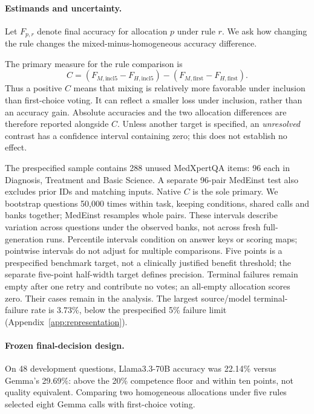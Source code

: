 \documentclass{article}
\begin{document}
\paragraph{Estimands and uncertainty.}
Let $F_{p,r}$ denote final accuracy for allocation $p$ under rule $r$. We ask how changing the rule changes the mixed-minus-homogeneous accuracy difference.

The primary measure for the rule comparison is
\begin{equation}
C=(F_{M,\mathrm{incl5}}-F_{H,\mathrm{incl5}})-(F_{M,\mathrm{first}}-F_{H,\mathrm{first}}).
\label{eq:C}
\end{equation}
Thus a positive $C$ means that mixing is relatively more favorable under inclusion than first-choice voting. It can reflect a smaller loss under inclusion, rather than an accuracy gain. Absolute accuracies and the two allocation differences are therefore reported alongside $C$. Unless another target is specified, an \emph{unresolved} contrast has a confidence interval containing zero; this does not establish no effect.

The prespecified sample contains 288 unused MedXpertQA items: 96 each in Diagnosis, Treatment and Basic Science. A separate 96-pair MedEinst test also excludes prior IDs and matching inputs. Native $C$ is the sole primary. We bootstrap questions 50,000 times within task, keeping conditions, shared calls and banks together; MedEinst resamples whole pairs. These intervals describe variation across questions under the observed banks, not across fresh full-generation runs. Percentile intervals condition on answer keys or scoring maps; pointwise intervals do not adjust for multiple comparisons. Five points is a prespecified benchmark target, not a clinically justified benefit threshold; the separate five-point half-width target defines precision. Terminal failures remain empty after one retry and contribute no votes; an all-empty allocation scores zero. Their cases remain in the analysis. The largest source/model terminal-failure rate is 3.73\%, below the prespecified 5\% failure limit (Appendix~\ref{app:representation}).

\paragraph{Frozen final-decision design.}
On 48 development questions, Llama3.3-70B \citep{meta2024llama33card} accuracy was 22.14\% versus Gemma's 29.69\%: above the 20\% competence floor and within ten points, not quality equivalent. Comparing two homogeneous allocations under five rules selected eight Gemma calls with first-choice voting.
\end{document}
